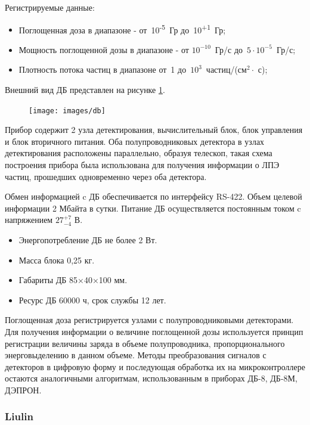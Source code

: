 Регистрируемые данные:
\begin{itemize}
	\item 
	Поглощенная доза в диапазоне - от~10\textsuperscript{-5}~Гр  до~10\textsuperscript{+1}~Гр;  
	\item  
	Мощность поглощенной дозы в диапазоне - от $10^{-10}$~Гр/с  до~$5\cdot10^{-5}$~Гр/с;
	\item  
	Плотность потока частиц в диапазоне от~1 до~$ 10^3 $~частиц/(см$^2\cdot$ с);    		
\end{itemize}

Внешний вид ДБ представлен на рисунке \ref{fig:db}.

\begin{figure}
\centering
\texttt{[image: images/db]}
\caption{}
\label{fig:db}
\end{figure}

Прибор содержит 2 узла детектирования, вычислительный блок, блок управления и блок вторичного питания. Оба полупроводниковых детектора в узлах детектирования расположены  параллельно,  образуя телескоп, такая схема построения прибора была использована для получения информации о ЛПЭ частиц, прошедших одновременно через оба детектора.         


Обмен информацией c ДБ обеспечивается по интерфейсу RS-422. Объем целевой информации 2 Мбайта в сутки. Питание ДБ осуществляется постоянным током c напряжением $ 27^{+7}_{-4} $ В. 

\begin{itemize}
\item Энергопотребление ДБ не более 2 Вт.
\item Масса блока 0,25 кг.
\item Габариты ДБ 85×40×100 мм. 
\item Ресурс ДБ  60000 ч, срок службы 12 лет.
\end{itemize}


Поглощенная доза регистрируется узлами с полупроводниковыми детекторами. Для получения информации о величине поглощенной дозы используется принцип регистрации величины заряда в объеме полупроводника, пропорционального энерговыделению в данном объеме. Методы преобразования сигналов с детекторов в цифровую форму и последующая обработка их на микроконтроллере остаются аналогичными алгоритмам, использованным в приборах ДБ-8, ДБ-8М, ДЭПРОН.  


\subsubsection{Liulin}

